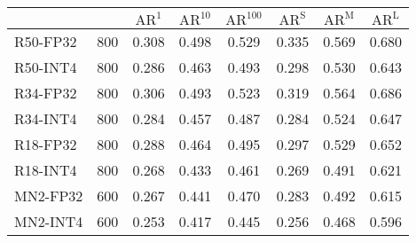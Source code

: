 \documentclass[
  fontset = source,
]{shtthesis}
\begin{document}
\begin{table}[p]
\begin{subtable}[t]{\columnwidth}
\begin{tabular}{lc*{6}{c}}
      & & $\mathrm{AR}^{1}$ & $\mathrm{AR}^{10}$ & $\mathrm{AR}^{100}$ &
      $\mathrm{AR} ^ {\mathrm{S}}$ & $\mathrm{AR} ^ {\mathrm{M}}$ & $\mathrm{AR} ^ {\mathrm{L}}$ \\
      \midrule
      R50-FP32 & 800 &0.308 &0.498 &0.529 &0.335 &0.569 &0.680 \\
      R50-INT4 & 800 &0.286 &0.463 &0.493 &0.298 &0.530 &0.643 \\
      \hdashline
      R34-FP32 & 800 &0.306 &0.493 &0.523 &0.319 &0.564 &0.686 \\
      R34-INT4 & 800 &0.284 &0.457 &0.487 &0.284 &0.524 &0.647 \\
      \hdashline
      R18-FP32 & 800 &0.288 &0.464 &0.495 &0.297 &0.529 &0.652 \\
      R18-INT4 & 800 &0.268 &0.433 &0.461 &0.269 &0.491 &0.621 \\
      \hdashline
      MN2-FP32 & 600 &0.267 &0.441 &0.470 &0.283 &0.492 &0.615 \\
      MN2-INT4 & 600 &0.253 &0.417 &0.445 &0.256 &0.468 &0.596 \\
      \bottomrule
    \end{tabular}
  \end{subtable}
\end{table}
\end{document}
